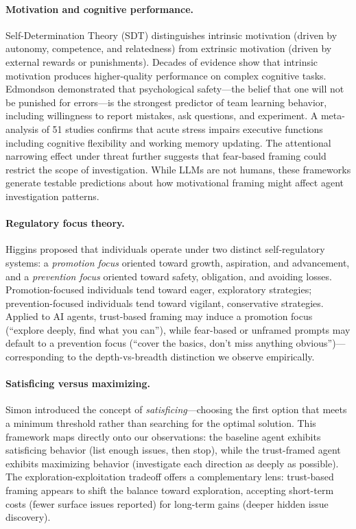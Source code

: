 \documentclass[11pt]{article}
\begin{document}
\paragraph{Motivation and cognitive performance.}
Self-Determination Theory (SDT) \cite{deci2000self,ryan2000intrinsic} distinguishes intrinsic motivation (driven by autonomy, competence, and relatedness) from extrinsic motivation (driven by external rewards or punishments). Decades of evidence show that intrinsic motivation produces higher-quality performance on complex cognitive tasks. Edmondson  demonstrated that psychological safety---the belief that one will not be punished for errors---is the strongest predictor of team learning behavior, including willingness to report mistakes, ask questions, and experiment. A meta-analysis of 51 studies \cite{shields2016stress} confirms that acute stress impairs executive functions including cognitive flexibility and working memory updating. The attentional narrowing effect under threat \cite{easterbrook1959effect,ohman2001fears} further suggests that fear-based framing could restrict the scope of investigation. While LLMs are not humans, these frameworks generate testable predictions about how motivational framing might affect agent investigation patterns.

\paragraph{Regulatory focus theory.}
Higgins  proposed that individuals operate under two distinct self-regulatory systems: a \emph{promotion focus} oriented toward growth, aspiration, and advancement, and a \emph{prevention focus} oriented toward safety, obligation, and avoiding losses. Promotion-focused individuals tend toward eager, exploratory strategies; prevention-focused individuals tend toward vigilant, conservative strategies. Applied to AI agents, trust-based framing may induce a promotion focus (``explore deeply, find what you can''), while fear-based or unframed prompts may default to a prevention focus (``cover the basics, don't miss anything obvious'')---corresponding to the depth-vs-breadth distinction we observe empirically.

\paragraph{Satisficing versus maximizing.}
Simon  introduced the concept of \emph{satisficing}---choosing the first option that meets a minimum threshold rather than searching for the optimal solution. This framework maps directly onto our observations: the baseline agent exhibits satisficing behavior (list enough issues, then stop), while the trust-framed agent exhibits maximizing behavior (investigate each direction as deeply as possible). The exploration-exploitation tradeoff \cite{march1991exploration} offers a complementary lens: trust-based framing appears to shift the balance toward exploration, accepting short-term costs (fewer surface issues reported) for long-term gains (deeper hidden issue discovery).
\end{document}
